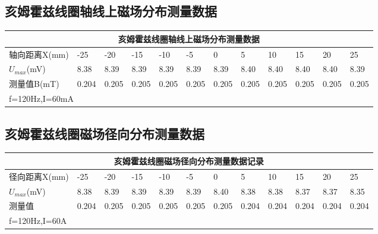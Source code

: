 \documentclass[12pt,a4paper]{article}
\begin{document}
    \subsection{亥姆霍兹线圈轴线上磁场分布测量数据}
        \begin{table}[H]
            \centering
            \begin{tabular}{|l|l|l|l|l|l|l|l|l|l|l|l|}
            \hline
                \multicolumn{12}{|c|}{亥姆霍兹线圈轴线上磁场分布测量数据}  \\ \hline
                轴向距离X(mm) & -25 & -20 & -15 & -10 & -5 & 0 & 5 & 10 & 15 & 20 & 25 \\ \hline
                $U_{max}$(mV) & 8.38 & 8.39 & 8.39 & 8.39 & 8.39 & 8.39 & 8.40 & 8.40 & 8.40 & 8.40 & 8.39 \\ \hline
                测量值B(mT) & 0.204 & 0.205 & 0.205 & 0.205 & 0.205 & 0.205 & 0.205 & 0.205 & 0.205 & 0.205 & 0.205 \\ \hline
                \multicolumn{12}{|l|}{f=120Hz,I=60mA} \\ \hline
            \end{tabular}
        \end{table}
    
    \subsection{亥姆霍兹线圈磁场径向分布测量数据}
    \begin{table}[H]
        \centering
        \begin{tabular}{|l|l|l|l|l|l|l|l|l|l|l|l|}
        \hline
            \multicolumn{12}{|c|}{亥姆霍兹线圈磁场径向分布测量数据记录} \\ \hline
            径向距离X(mm) & -25 & -20 & -15 & -10 & -5 & 0 & 5 & 10 & 15 & 20 & 25 \\ \hline
            $U_{max}$(mV) & 8.38 & 8.39 & 8.39 & 8.39 & 8.39 & 8.40 & 8.38 & 8.38 & 8.37 & 8.37 & 8.35 \\ \hline
            测量值 & 0.204 & 0.205 & 0.205 & 0.205 & 0.205 & 0.205 & 0.204 & 0.204 & 0.204 & 0.204 & 0.204 \\ \hline
            \multicolumn{12}{|l|}{f=120Hz,I=60A} \\ \hline
        \end{tabular}
    \end{table}
\end{document}
